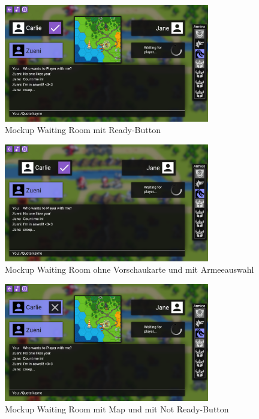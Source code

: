 \documentclass[12pt, titlepage]{scrartcl}
\begin{document}
			\begin{figure}[H] 
				\centering
				\includegraphics[width=0.8\textwidth]{Waiting_Room_Game_Mit_Map_Ready_Button.png}
				\caption{Mockup Waiting Room mit \glqq Ready\grqq-Button}
				\label{WaitingRoomWithReadyButton}
			\end{figure}
			\begin{figure}[H] 
				\centering
				\includegraphics[width=0.8\textwidth]{Waitin_Room_Game_Ohne_Map.png}
				\caption{Mockup Waiting Room ohne Vorschaukarte und mit Armeeauswahl}
				\label{WaitingRoomWithOutMapAndWithArmySelector}
			\end{figure}
			\begin{figure}[H] 
				\centering
				\includegraphics[width=0.8\textwidth]{Waiting_Room_Game_Mit_Map_Not_Ready.png}
				\caption{Mockup Waiting Room mit Map und mit \glqq Not Ready\grqq-Button}
				\label{WaitingRoomWithMapAndWithNotReayButton}
			\end{figure}
		
\end{document}
